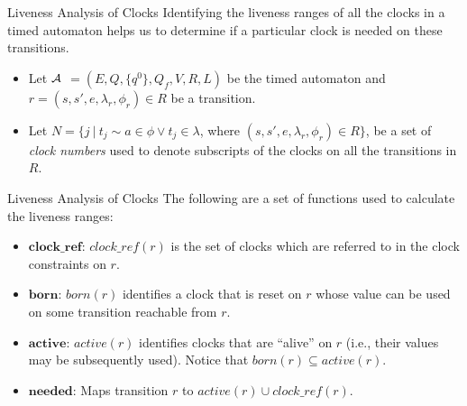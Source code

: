 \documentclass[10pt]{beamer}
\theoremstyle{plain}
\theoremstyle{definition}
\newcommand*{\Var}[1]{\ensuremath{\mathit{#1}}}
\newcommand*{\Active}{\Var{active}}
\newcommand*{\Born}{\Var{born}}
\begin{document}
\begin{frame}{Liveness Analysis of Clocks}
Identifying the liveness ranges of all the clocks in a timed automaton helps us to  determine if a particular clock is needed on these transitions.
\begin{itemize}
	\item Let $\cal A$ $= (E, Q, \{q^0\}, Q_f, V, R, L)$ be the timed automaton and $r = (s, s', e, \lambda_r, \phi_r) \in R$ be a transition.
	\item Let $N = \{j~|~t_j\sim a \in \phi \vee t_j \in \lambda$, where $(s, s', e, \lambda_r, \phi_r) \in R\}$, be a set of \emph{clock numbers} used to denote subscripts of the clocks on all the transitions in $R$.
\end{itemize}
\end{frame}

\begin{frame}{Liveness Analysis of Clocks}
	The following are a set of functions used to calculate the liveness ranges:
	\begin{itemize}
		\item
		$\mathit{\textbf{clock\_ref}}$: $\mathit{clock\_ref(r)}$ is the set of clocks which are referred to in the clock constraints on $r$.
		\item
		$\textbf{born}$: $\Born(r)$ identifies a clock that is reset on $r$  whose value can be used on some transition	reachable from $r$.
		\item 
		$\textbf{active}$: $\Active(r)$ identifies clocks that are ``alive'' on $r$ (i.e., their  values may be subsequently used). Notice that $\Born(r)\subseteq \Active(r)$.
		\item
		$\textbf{needed}$: Maps transition $r$ to $\Active(r)\cup \mathit{clock\_ref(r)}$.
		
	\end{itemize}

\end{frame}
\end{document}

